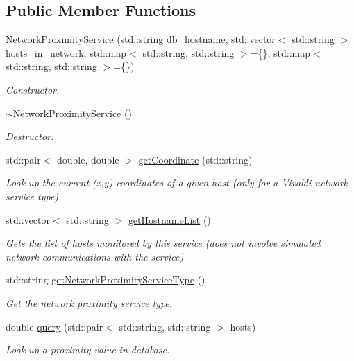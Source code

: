 \subsection*{Public Member Functions}
\begin{DoxyCompactItemize}
\item 
\hyperlink{classwrench_1_1_network_proximity_service_a8f7021f0fd9a5a6393fc447652c2371b}{Network\+Proximity\+Service} (std\+::string db\+\_\+hostname, std\+::vector$<$ std\+::string $>$ hosts\+\_\+in\+\_\+network, std\+::map$<$ std\+::string, std\+::string $>$=\{\}, std\+::map$<$ std\+::string, std\+::string $>$=\{\})
\begin{DoxyCompactList}\small\item\em Constructor. \end{DoxyCompactList}\item 
\mbox{\label{classwrench_1_1_network_proximity_service_adca67c67fb6a683ffc91987c2e4e329a}} 
\hyperlink{classwrench_1_1_network_proximity_service_adca67c67fb6a683ffc91987c2e4e329a}{$\sim$\+Network\+Proximity\+Service} ()
\begin{DoxyCompactList}\small\item\em Destructor. \end{DoxyCompactList}\item 
std\+::pair$<$ double, double $>$ \hyperlink{classwrench_1_1_network_proximity_service_af7392b6f906fa758328de9cfa283d1bc}{get\+Coordinate} (std\+::string)
\begin{DoxyCompactList}\small\item\em Look up the current (x,y) coordinates of a given host (only for a Vivaldi network service type) \end{DoxyCompactList}\item 
std\+::vector$<$ std\+::string $>$ \hyperlink{classwrench_1_1_network_proximity_service_a5e3f4189424c2d44db198efb7984e3ef}{get\+Hostname\+List} ()
\begin{DoxyCompactList}\small\item\em Gets the list of hosts monitored by this service (does not involve simulated network communications with the service) \end{DoxyCompactList}\item 
std\+::string \hyperlink{classwrench_1_1_network_proximity_service_a3a70bf6b279c431f5f9cffc4207822af}{get\+Network\+Proximity\+Service\+Type} ()
\begin{DoxyCompactList}\small\item\em Get the network proximity service type. \end{DoxyCompactList}\item 
double \hyperlink{classwrench_1_1_network_proximity_service_a3fe7aa39935af1eeeccdd18288f88068}{query} (std\+::pair$<$ std\+::string, std\+::string $>$ hosts)
\begin{DoxyCompactList}\small\item\em Look up a proximity value in database. \end{DoxyCompactList}\end{DoxyCompactItemize}
